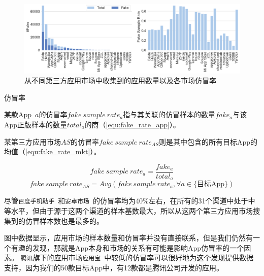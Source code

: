 \begin{figure}[htbp]
	\centering
  \setlength{\belowcaptionskip}{-10pt}
	\includegraphics[width=\textwidth]{./Figures/edwin-Number_of_samples_collected_markets_3.png}
	\caption{从不同第三方应用市场中收集到的应用数量以及各市场仿冒率}
	\label{fig:Sample_source}
\end{figure}

\begin{Def}
    仿冒率

    某款App~$a$的仿冒率$fake~sample~rate_a$指与其关联的仿冒样本的数量$fake_a$与该App正版样本的数量$total_a$的商（\autoref{equ:fake_rate_app}）。

    某第三方应用市场$AS$的仿冒率$fake~sample~rate_{AS}$则是其中包含的所有目标App的均值（\autoref{equ:fake_rate_mkt}）。
\end{Def}

\begin{equation}
    fake~sample~rate_a = \frac{fake_a}{total_a}
    \label{equ:fake_rate_app}
\end{equation}
\begin{equation}
    fake~sample~rate_{AS} = Avg(fake~sample~rate_a, \forall a \in \text{\{目标App\}})
    \label{equ:fake_rate_mkt}
\end{equation}
\vspace{1mm}

尽管\texttt{百度手机助手}~\cite{Baiduappstore}和\texttt{安卓市场}~\cite{Hiapk}的仿冒率均为40\%左右，在所有的31个渠道中处于中等水平，但由于源于这两个渠道的样本基数最大，所以从这两个第三方应用市场搜集到的仿冒样本数也是最多的。

图中数据显示，应用市场的样本数量和仿冒率并没有直接联系，但是我们仍然有一个有趣的发现，那就是App本身和市场的关系有可能是影响App仿冒率的一个因素。
\texttt{腾讯}旗下的应用市场\texttt{应用宝}~\cite{Myapp}中较低的仿冒率可以很好地为这个发现提供数据支持，因为我们的50款目标App中，有12款都是腾讯公司开发的应用。

